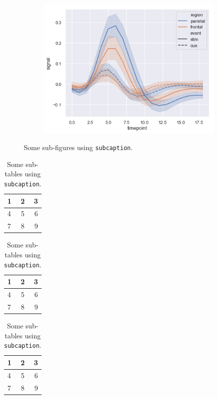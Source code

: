 \documentclass[twocolumn]{article}
\begin{document}
\begin{figure}[t]
\begin{subfigure}[b]{0.32\linewidth}
    \includegraphics[width=\textwidth]{images/errorband_lineplots.png}
    \label{fig:subcaption-subfigure3}
\end{subfigure}
\caption{Some sub-figures using \texttt{subcaption}.}
\label{fig:subcaption-subfigures}
\end{figure}
 
\begin{table}[t]
\centering
\begin{subtable}[b]{0.32\linewidth}
    \centering
    \begin{tabular}{lcr}
        \hline
        1 & 2 & 3 \\
        \hline
        4 & 5 & 6 \\
        7 & 8 & 9 \\
        \hline
    \end{tabular}
    \label{tab:subcaption-subtable1}
\end{subtable}
\begin{subtable}[b]{0.32\linewidth}
    \centering
    \begin{tabular}{lcr}
        \hline
        1 & 2 & 3 \\
        \hline
        4 & 5 & 6 \\
        7 & 8 & 9 \\
        \hline
    \end{tabular}
    \label{tab:subcaption-subtable2}
\end{subtable}
\begin{subtable}[b]{0.32\linewidth}
    \centering
    \begin{tabular}{lcr}
        \hline
        1 & 2 & 3 \\
        \hline
        4 & 5 & 6 \\
        7 & 8 & 9 \\
        \hline
    \end{tabular}
    \label{tab:subcaption-subtable3}
\end{subtable}
\caption{Some sub-tables using \texttt{subcaption}.}
\label{tab:subcaption-subtables}
\end{table}
 
\end{document}
